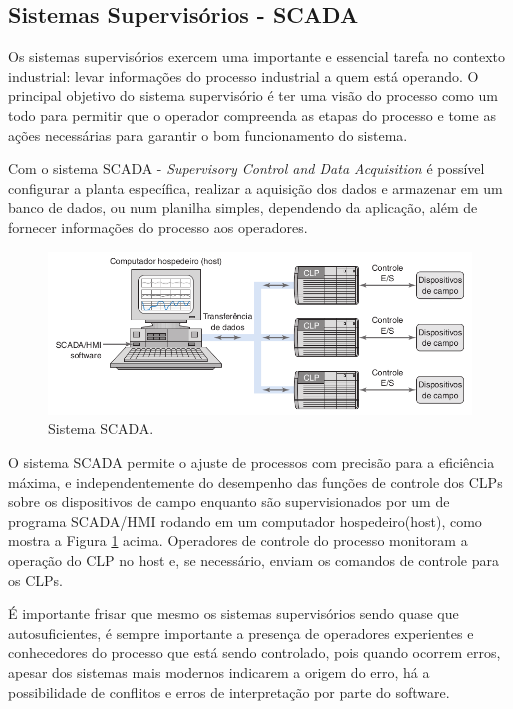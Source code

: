 \documentclass[a4paper, 12pt]{article}
\begin{document}
	\subsection{Sistemas Supervisórios - SCADA}
		
		Os sistemas supervisórios exercem uma importante e essencial tarefa no contexto
		industrial: levar informações do processo industrial a quem está operando.
		O principal objetivo do sistema supervisório é ter uma visão do processo como um
		todo para permitir que o operador compreenda as etapas do processo e tome as ações
		necessárias para garantir o bom funcionamento do sistema.
		
		Com o sistema SCADA - \textit{Supervisory Control and Data Acquisition} é possível
		configurar a planta específica, realizar a aquisição dos dados e armazenar em um
		banco de dados, ou num planilha simples, dependendo da aplicação, além de fornecer
		informações do processo aos operadores.
		
		\begin{figure}[H]
			\centering
			\includegraphics[scale=0.5]{figures/SCADA.png}
			\caption{Sistema SCADA.}
			\label{fig:scada}
		\end{figure}
		
		O sistema SCADA permite o ajuste de processos com precisão para a eficiência máxima, e
		independentemente do desempenho das funções de controle dos CLPs sobre os dispositivos
		de campo enquanto são supervisionados por um de programa SCADA/HMI rodando em um computador
		hospedeiro(host), como mostra a Figura \ref{fig:scada} acima. Operadores de controle do processo monitoram
		a operação do CLP no host e, se necessário, enviam os comandos de controle para os CLPs.
		
		É importante frisar que mesmo os sistemas supervisórios sendo quase que autosuficientes, é sempre
		importante a presença de operadores experientes e conhecedores do processo que está sendo controlado,
		pois quando ocorrem erros, apesar dos sistemas mais modernos indicarem a origem do erro, 
		há a possibilidade de conflitos e erros de interpretação por parte do software.
\end{document}
